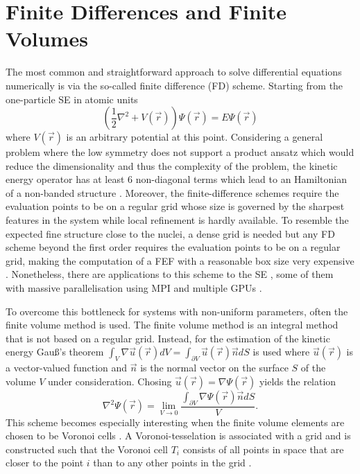 \section{Finite Differences and Finite Volumes}
\label{ch:FD}
The most common and straightforward approach to solve differential equations numerically is via the so-called finite difference (FD) scheme.
Starting from the one-particle SE in atomic units
\begin{equation} 
\left( \frac 12 \nabla^2 + V(\vec{r}) \right) \Psi(\vec{r})=E\Psi(\vec{r})
\end{equation}
where $V(\vec{r})$ is an arbitrary potential at this point.
Considering a general problem where the low symmetry does not support a product ansatz which would reduce the dimensionality and thus the complexity of the problem, the kinetic energy operator has at least $6$ non-diagonal terms which lead to an Hamiltonian of a non-banded structure \cite{fd_Cart}.
Moreover, the finite-difference schemes require the evaluation points to be on a regular grid whose size is governed by the sharpest features in the system while local refinement is hardly available.
To resemble the expected fine structure close to the nuclei, a dense grid is needed but any FD scheme beyond the first order requires the evaluation points to be on a regular grid, making the computation of a FEF with a reasonable box size very expensive \cite{richardsFD}.
Nonetheless, there are applications to this scheme to the SE \cite{fd_Cart,fd_Cart2}, some of them with massive parallelisation using MPI and multiple GPUs \cite{fd_gpu}.

To overcome this bottleneck for systems with non-uniform parameters, often the finite volume method is used.
The finite volume method is an integral method that is not based on a regular grid.
Instead, for the estimation of the kinetic energy Gau\ss's theorem $\int_V \nabla \vec{u}(\vec{r}) dV=\int_{\partial V} \vec{u}(\vec{r}) \vec{n}dS $ is used where $\vec{u}(\vec{r})$ is a vector-valued function and $\vec{n}$ is the normal vector on the surface $S$ of the volume $V$ under consideration.
Chosing $\vec{u}(\vec{r})=\nabla\Psi(\vec{r})$ yields the relation
\begin{equation} \label{eq:kinFV}
   \nabla^2\Psi(\vec{r})=\lim_{V\rightarrow 0} \frac{ \int_{\partial V} \nabla\Psi(\vec{r}) \vec{n} dS}{V}.
\end{equation}
This scheme becomes especially interesting when the finite volume elements are chosen to be Voronoi cells \cite{Son_Chu0}.
A Voronoi-tesselation is associated with a grid and is constructed such that the Voronoi cell $T_i$ consists of all points in space that are closer to the point $i$ than to any other points in the grid \cite{voronoi,voronoi1,voronoi2}.

